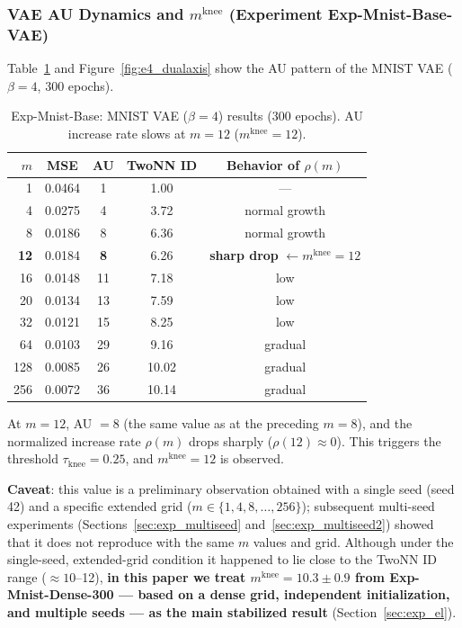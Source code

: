 \documentclass[make,article,submit,pdftex,moreauthors]{Definitions/mdpi}
\newcommand{\mknee}{m^{\mathrm{knee}}}
\begin{document}
\subsubsection{VAE AU Dynamics and $\mknee$ (Experiment Exp-Mnist-Base-VAE)}

Table~\ref{tab:e4_vae} and Figure~\ref{fig:e4_dualaxis} show the AU pattern of the MNIST VAE
($\beta = 4$, 300 epochs).

\begin{table}[H]
\centering
\caption{Exp-Mnist-Base: MNIST VAE ($\beta=4$) results (300 epochs). AU increase rate slows at $m=12$ ($\mknee=12$).}
\label{tab:e4_vae}
\small
\begin{tabular}{rcccc}
\toprule
$m$ & MSE & AU & TwoNN ID & Behavior of $\rho(m)$ \\
\midrule
1   & 0.0464 & 1  & 1.00 & --- \\
4   & 0.0275 & 4  & 3.72 & normal growth \\
8   & 0.0186 & 8  & 6.36 & normal growth \\
\textbf{12} & 0.0184 & \textbf{8}  & 6.26 & \textbf{sharp drop} $\leftarrow \mknee = 12$ \\
16  & 0.0148 & 11 & 7.18 & low \\
20  & 0.0134 & 13 & 7.59 & low \\
32  & 0.0121 & 15 & 8.25 & low \\
64  & 0.0103 & 29 & 9.16 & gradual \\
128 & 0.0085 & 26 & 10.02 & gradual \\
256 & 0.0072 & 36 & 10.14 & gradual \\
\bottomrule
\end{tabular}
\end{table}

At $m = 12$, AU $= 8$ (the same value as at the preceding $m = 8$), and the normalized
increase rate $\rho(m)$ drops sharply ($\rho(12) \approx 0$).
This triggers the threshold $\tau_{\mathrm{knee}} = 0.25$, and $\mknee = 12$ is observed.

\textbf{Caveat}: this value is a preliminary observation obtained with a single seed (seed 42)
and a specific extended grid ($m \in \{1,4,8,\ldots,256\}$); subsequent multi-seed experiments
(Sections~\ref{sec:exp_multiseed} and~\ref{sec:exp_multiseed2}) showed that it does not
reproduce with the same $m$ values and grid.
Although under the single-seed, extended-grid condition it happened to lie close to the TwoNN ID
range ($\approx 10$--12),
\textbf{in this paper we treat $\mknee = 10.3 \pm 0.9$ from Exp-Mnist-Dense-300 --- based on a
dense grid, independent initialization, and multiple seeds --- as the main stabilized result}
(Section~\ref{sec:exp_el}).
\end{document}
